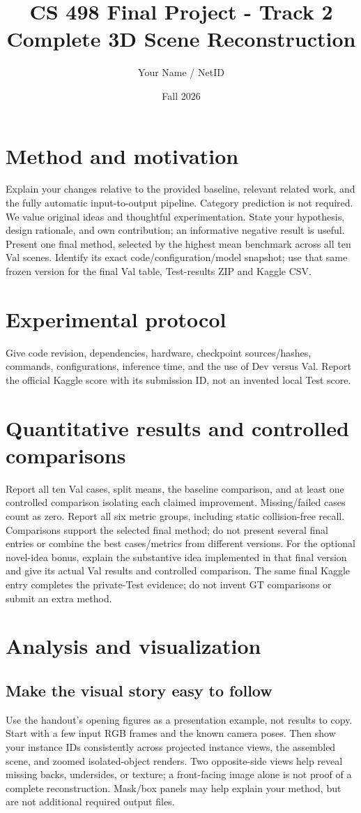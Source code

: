 \documentclass[11pt]{article}
\title{CS 498 Final Project - Track 2\\Complete 3D Scene Reconstruction}
\author{Your Name / NetID}
\date{Fall 2026}
\begin{document}
\maketitle
\section{Method and motivation}
Explain your changes relative to the provided baseline, relevant related work,
and the fully automatic input-to-output pipeline. Category prediction is not required.
We value original ideas and thoughtful experimentation. State your hypothesis,
design rationale, and own contribution; an informative negative result is useful.
Present one final method, selected by the highest mean benchmark across all
ten Val scenes. Identify its exact code/configuration/model snapshot; use that
same frozen version for the final Val table, Test-results ZIP and Kaggle CSV.
\section{Experimental protocol}
Give code revision, dependencies, hardware, checkpoint sources/hashes, commands,
configurations, inference time, and the use of Dev versus Val. Report the
official Kaggle score with its submission ID, not an invented local Test score.
\section{Quantitative results and controlled comparisons}
Report all ten Val cases, split means, the baseline comparison, and at least
one controlled comparison isolating each claimed improvement. Missing/failed
cases count as zero. Report all six metric groups, including static collision-free recall.
Comparisons support the selected final method; do not present several final
entries or combine the best cases/metrics from different versions.
For the optional novel-idea bonus, explain the substantive idea implemented in
that final version and give its actual Val results and controlled comparison.
The same final Kaggle entry completes the private-Test evidence; do not invent
GT comparisons or submit an extra method.
\section{Analysis and visualization}
\subsection{Make the visual story easy to follow}
Use the handout's opening figures as a presentation example, not results to
copy. Start with a few input RGB frames and the known camera poses. Then show
your instance IDs consistently across projected instance views, the assembled
scene, and zoomed isolated-object renders. Two opposite-side views help reveal
missing backs, undersides, or texture; a front-facing image alone is not proof
of a complete reconstruction. Mask/box panels may help explain your method,
but are not additional required output files.
\end{document}
